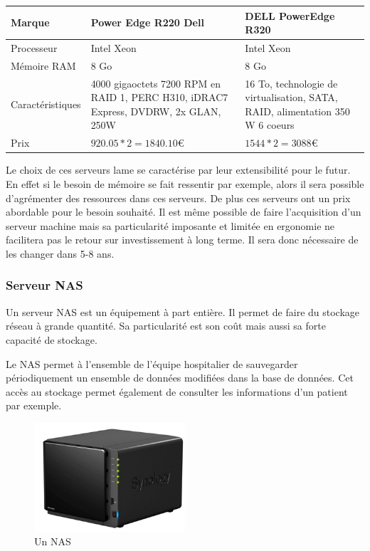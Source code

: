     \begin{center}
        \begin{tabular}{|l|p{5cm}|p{5cm}|}
          \hline
            Marque  &
Power Edge R220 Dell
    &   DELL PowerEdge R320
 \\
          \hline
Processeur
  &
Intel Xeon
    &
Intel Xeon
 \\
          \hline
Mémoire RAM
  &
8 Go
    &
8 Go
 \\
          \hline
            Caractéristiques  &
4000 gigaoctets 7200 RPM en RAID 1, PERC H310, iDRAC7 Express, DVDRW, 2x GLAN, 250W
                & 16 To, technologie de virtualisation, SATA, RAID, alimentation 350 W
6 coeurs
                  \\
        \hline
            Prix  &
$920.05 * 2 = 1840.10  \euro   $
    &
$1544 * 2 = 3088  \euro   $
 \\
          \hline
        \end{tabular}
    \end{center}

Le choix de ces serveurs lame se caractérise par leur extensibilité pour le futur. En effet si le besoin de mémoire se fait ressentir par exemple, alors il sera possible d'agrémenter des ressources dans ces serveurs. De plus ces serveurs ont un prix abordable pour le besoin souhaité. Il est même possible de faire l'acquisition d'un serveur machine mais sa particularité imposante et limitée en ergonomie ne facilitera pas le retour sur investissement à long terme. Il sera donc nécessaire de les changer dans 5-8 ans.


\subsubsection{Serveur NAS}

Un serveur NAS est un équipement à part entière. Il permet de faire du stockage réseau à grande quantité.
Sa particularité est son coût mais aussi sa forte capacité de stockage.

Le NAS permet à l'ensemble de l'équipe hospitalier de sauvegarder périodiquement un ensemble de données modifiées dans la base de données. Cet accès au stockage permet également de consulter les informations d'un patient par exemple.

\begin{figure}[!ht]
    \center
    \includegraphics[width=0.5\textwidth]{./images/15.png}
    \caption{Un NAS}
\end{figure}

